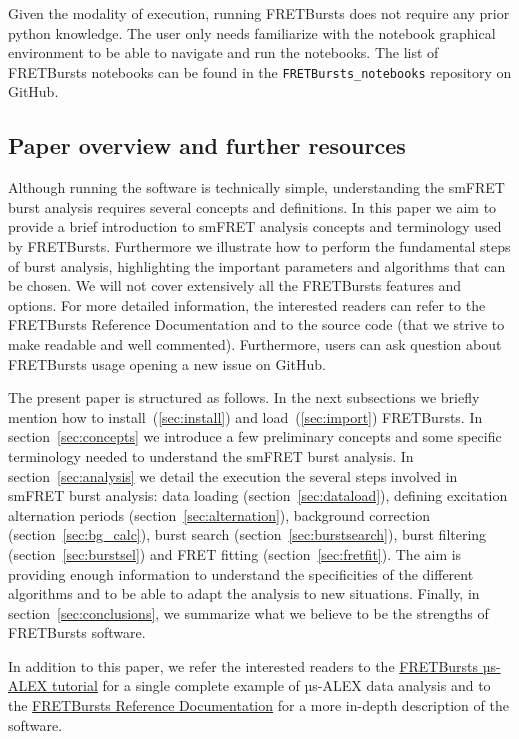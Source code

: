 Given the modality of execution, running FRETBursts does not require
any prior python knowledge. The user only needs familiarize with the
notebook graphical environment to be able to navigate and run the notebooks.
The list of FRETBursts notebooks can be found in the 
\verb|FRETBursts_notebooks| repository on GitHub.

\subsection{Paper overview and further resources}

Although running the software is technically simple, understanding the smFRET 
burst analysis requires several concepts and definitions.
In this paper we aim to provide a brief introduction to smFRET analysis concepts
and terminology used by FRETBursts. Furthermore we illustrate how to perform
the fundamental steps of burst analysis, highlighting the important parameters
and algorithms that can be chosen. We will not cover extensively all the FRETBursts
features and options. For more detailed information, the interested readers can refer 
to the FRETBursts Reference Documentation and to the source code (that we strive 
to make readable and well commented). 
Furthermore, users can ask question about FRETBursts usage opening a new issue on GitHub.

The present paper is structured as follows. 
In the next subsections we briefly mention how to install~(\ref{sec:install}) and 
load~(\ref{sec:import}) FRETBursts.
In section~\ref{sec:concepts} we
introduce a few preliminary concepts and some specific terminology needed 
to understand the smFRET burst analysis. 
In section~\ref{sec:analysis} we detail the execution the several steps involved
in smFRET burst analysis: data loading (section~\ref{sec:dataload}), defining 
excitation alternation periods (section~\ref{sec:alternation}), background 
correction (section~\ref{sec:bg_calc}), burst search (section~\ref{sec:burstsearch}), 
burst filtering (section~\ref{sec:burstsel}) and FRET fitting (section~\ref{sec:fretfit}).
The aim is providing enough information to understand the specificities of 
the different algorithms and to be able to adapt the analysis to new situations.
Finally, in section~\ref{sec:conclusions}, we summarize what we believe to be
the strengths of FRETBursts software.

In addition to this paper, we refer the interested readers to the 
\href{http://nbviewer.ipython.org/github/tritemio/FRETBursts_notebooks/blob/master/notebooks/FRETBursts\%20-\%20us-ALEX\%20smFRET\%20burst\%20analysis.ipynb}{FRETBursts µs-ALEX tutorial} 
for a single complete example of µs-ALEX data analysis and to the
\href{http://fretbursts.readthedocs.org/}{FRETBursts Reference Documentation}
for a more in-depth description of the software.

